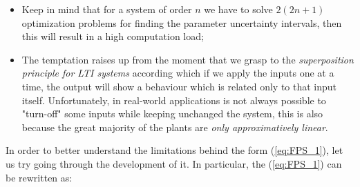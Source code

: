 \begin{itemize}
    \item Keep in mind that for a system of order $n$ we have to solve $2(2n+1)$ optimization problems for finding the parameter uncertainty intervals, then this will result in a high computation load; 
    \item The temptation raises up from the moment that we grasp to the \textit{superposition principle for LTI systems} according which if we apply the inputs one at a time, the output will show a behaviour which is related only to that input itself. Unfortunately, in real-world applications is not always possible to "turn-off" some inputs while keeping unchanged the system, this is also because the great majority of the plants are \textit{only approximatively linear}.
\end{itemize}

\noindent
In order to better understand the limitations behind the form (\ref{eq:FPS_1}), let us try going through the development of it. In particular, the (\ref{eq:FPS_1}) can be rewritten as: 


